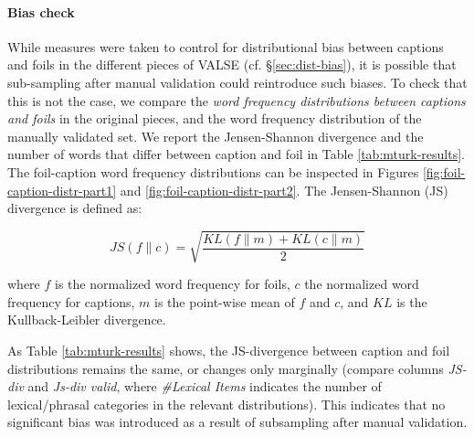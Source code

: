 \documentclass[11pt]{article}
\newcommand{\dataset}{VALSE}
\begin{document}
\paragraph{Bias check}
While measures were taken to control for distributional bias between captions and foils in the different pieces of \dataset{} (cf. \S \ref{sec:dist-bias}), it is possible that sub-sampling after manual validation could reintroduce such biases. To check that this is not the case, we compare the \textit{word frequency distributions between captions and foils} in the original pieces, and the word frequency distribution of the manually validated set. We report the Jensen-Shannon divergence and the number of words that differ between caption and foil in Table \ref{tab:mturk-results}. The foil-caption word frequency distributions can be inspected in Figures \ref{fig:foil-caption-distr-part1} and \ref{fig:foil-caption-distr-part2}. The Jensen-Shannon (JS) divergence is defined as:

$$ JS(f \parallel c) = \sqrt{\frac{KL(f \parallel m) + KL(c \parallel m)}{2}} $$

\noindent
where $f$ is the normalized word frequency for foils, $c$ the normalized word frequency for captions, $m$ is the point-wise mean of $f$ and $c$, and $KL$ is the Kullback-Leibler divergence. 

As Table \ref{tab:mturk-results} shows, the JS-divergence between caption and foil distributions remains the same, or changes only marginally (compare columns {\em JS-div} and {\em Js-div valid}, where {\em \#Lexical Items} indicates the number of lexical/phrasal categories in the relevant distributions). This indicates that no significant bias was introduced as a result of subsampling after manual validation.
\end{document}
